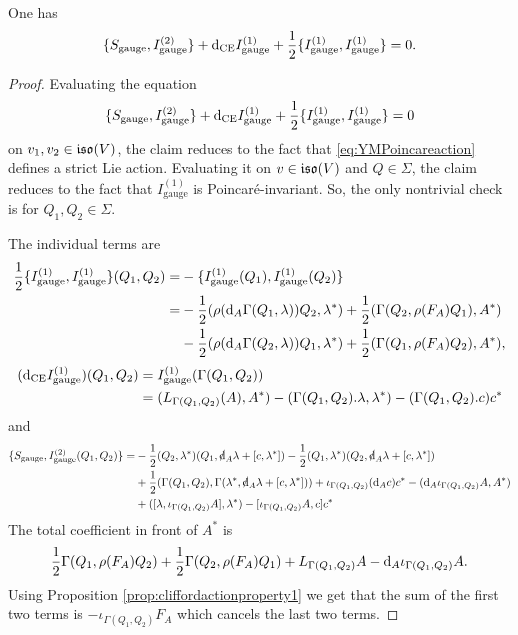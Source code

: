 \documentclass[10pt, oneside]{article}
\newcommand{\gauge}{\mathrm{gauge}}
\begin{document}
\begin{lemma}
One has
\[\{S_{\gauge}, I_{\gauge}^{(2)}\} + \d_{\mr{CE}} I_{\gauge}^{(1)} + \frac{1}{2}\{I_{\gauge}^{(1)}, I_{\gauge}^{(1)}\} = 0.\]
\label{lm:gaugemultiplet2}
\end{lemma}
\begin{proof}
Evaluating the equation
\[\{S_{\gauge}, I_{\gauge}^{(2)}\} + \d_{\mr{CE}} I_{\gauge}^{(1)} + \frac{1}{2}\{I_{\gauge}^{(1)}, I_{\gauge}^{(1)}\} = 0\]
on $v_1, v_2\in \mathfrak{iso}(V)$, the claim reduces to the fact that \eqref{eq:YMPoincareaction} defines a strict Lie action. Evaluating it on $v\in\mathfrak{iso}(V)$ and $Q\in\Sigma$, the claim reduces to the fact that $I_{\gauge}^{(1)}$ is Poincar\'{e}-invariant. So, the only nontrivial check is for $Q_1,Q_2\in\Sigma$.

The individual terms are
\begin{align*}
\frac{1}{2}\{I_{\gauge}^{(1)}, I_{\gauge}^{(1)}\}(Q_1, Q_2) = &-\{I_{\gauge}^{(1)}(Q_1), I_{\gauge}^{(1)}(Q_2)\} \\
= &-\frac{1}{2}(\rho(\d_A \Gamma(Q_1, \lambda)) Q_2, \lambda^*) + \frac{1}{2}(\Gamma(Q_2, \rho(F_A)Q_1), A^*) \\
&-\frac{1}{2}(\rho(\d_A \Gamma(Q_2, \lambda)) Q_1, \lambda^*) + \frac{1}{2}(\Gamma(Q_1, \rho(F_A)Q_2), A^*),
\end{align*}
\begin{align*}
(\d_{\mr{CE}} I_{\gauge}^{(1)})(Q_1, Q_2) &= I_{\gauge}^{(1)}(\Gamma(Q_1, Q_2)) \\
&= (L_{\Gamma(Q_1, Q_2)}(A), A^*) -(\Gamma(Q_1, Q_2).\lambda, \lambda^*) - (\Gamma(Q_1, Q_2).c) c^*
\end{align*}
and
\begin{align*}
\{S_{\gauge}, I_{\gauge}^{(2)}(Q_1, Q_2)\} = &-\frac{1}{2}(Q_2, \lambda^*)(Q_1, \sd{\d}_A \lambda + [c, \lambda^*]) - \frac{1}{2}(Q_1, \lambda^*)(Q_2, \sd{\d}_A \lambda + [c, \lambda^*]) \\
&+\frac{1}{2}(\Gamma(Q_1, Q_2), \Gamma(\lambda^*, \sd{\d}_A \lambda + [c, \lambda^*])) + \iota_{\Gamma(Q_1, Q_2)}(\d_A c) c^* - (\d_A\iota_{\Gamma(Q_1, Q_2)} A, A^*) \\
&+ ([\lambda, \iota_{\Gamma(Q_1, Q_2)}A], \lambda^*) - [\iota_{\Gamma(Q_1, Q_2)} A, c] c^*
\end{align*}
The total coefficient in front of $A^*$ is
\[\frac{1}{2}\Gamma(Q_1, \rho(F_A)Q_2) + \frac{1}{2}\Gamma(Q_2, \rho(F_A) Q_1) + L_{\Gamma(Q_1, Q_2)} A - {\rm d}_A \iota_{\Gamma(Q_1, Q_2)} A.\]
Using Proposition \ref{prop:cliffordactionproperty1} we get that the sum of the first two terms is $-\iota_{\Gamma(Q_1, Q_2)}F_A$ which cancels the last two terms.


\end{proof}
\end{document}

